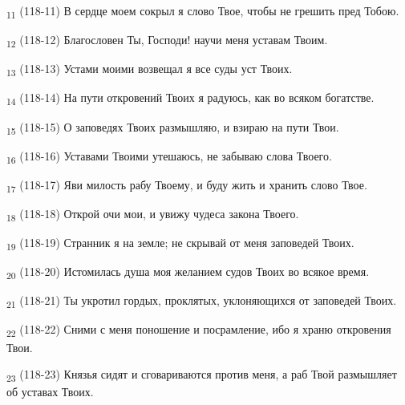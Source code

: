 \begin{tcolorbox}
\textsubscript{11} (118-11) В сердце моем сокрыл я слово Твое, чтобы не грешить пред Тобою.
\end{tcolorbox}
\begin{tcolorbox}
\textsubscript{12} (118-12) Благословен Ты, Господи! научи меня уставам Твоим.
\end{tcolorbox}
\begin{tcolorbox}
\textsubscript{13} (118-13) Устами моими возвещал я все суды уст Твоих.
\end{tcolorbox}
\begin{tcolorbox}
\textsubscript{14} (118-14) На пути откровений Твоих я радуюсь, как во всяком богатстве.
\end{tcolorbox}
\begin{tcolorbox}
\textsubscript{15} (118-15) О заповедях Твоих размышляю, и взираю на пути Твои.
\end{tcolorbox}
\begin{tcolorbox}
\textsubscript{16} (118-16) Уставами Твоими утешаюсь, не забываю слова Твоего.
\end{tcolorbox}
\begin{tcolorbox}
\textsubscript{17} (118-17) Яви милость рабу Твоему, и буду жить и хранить слово Твое.
\end{tcolorbox}
\begin{tcolorbox}
\textsubscript{18} (118-18) Открой очи мои, и увижу чудеса закона Твоего.
\end{tcolorbox}
\begin{tcolorbox}
\textsubscript{19} (118-19) Странник я на земле; не скрывай от меня заповедей Твоих.
\end{tcolorbox}
\begin{tcolorbox}
\textsubscript{20} (118-20) Истомилась душа моя желанием судов Твоих во всякое время.
\end{tcolorbox}
\begin{tcolorbox}
\textsubscript{21} (118-21) Ты укротил гордых, проклятых, уклоняющихся от заповедей Твоих.
\end{tcolorbox}
\begin{tcolorbox}
\textsubscript{22} (118-22) Сними с меня поношение и посрамление, ибо я храню откровения Твои.
\end{tcolorbox}
\begin{tcolorbox}
\textsubscript{23} (118-23) Князья сидят и сговариваются против меня, а раб Твой размышляет об уставах Твоих.
\end{tcolorbox}
